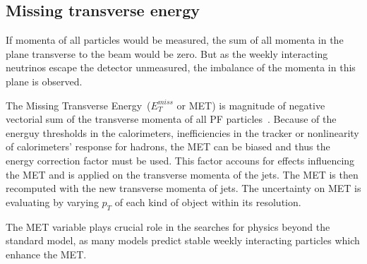 \subsection{Missing transverse energy}


If momenta of all particles would be measured, the sum of all momenta in the plane transverse to the beam would be zero. But as the weekly interacting neutrinos escape the detector unmeasured, the imbalance of the momenta in this plane is observed. 

The Missing Transverse Energy~($E_{T}^{miss}$ or MET) is magnitude of negative vectorial sum of the transverse momenta of all PF particles~\cite{CMS:2016ljj}. Because of the energuy thresholds in the calorimeters, inefficiencies in the tracker or nonlinearity of calorimeters' response for hadrons, the MET can be biased and thus the energy correction factor must be used. This factor accouns for effects influencing the MET and is applied on the transverse momenta of the jets. The MET is then recomputed with the new transverse momenta of jets. The uncertainty on MET is evaluating by varying $p_{T}$ of each kind of object within its resolution. 

The MET variable plays crucial role in the searches for physics beyond the standard model, as many models predict stable weekly interacting particles which enhance the MET.
